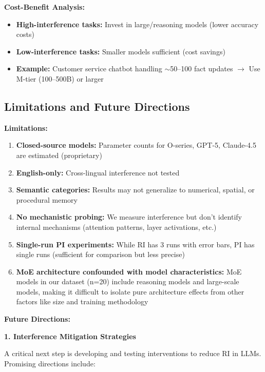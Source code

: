 \documentclass{article}
\begin{document}
\textbf{Cost-Benefit Analysis:}
\begin{itemize}[itemsep=2pt,topsep=3pt,parsep=0pt]
    \item \textbf{High-interference tasks:} Invest in large/reasoning models (lower accuracy costs)
    \item \textbf{Low-interference tasks:} Smaller models sufficient (cost savings)
    \item \textbf{Example:} Customer service chatbot handling $\sim$50--100 fact updates $\rightarrow$ Use M-tier (100--500B) or larger
\end{itemize}

\subsection{Limitations and Future Directions}

\textbf{Limitations:}

\begin{enumerate}
    \item \textbf{Closed-source models:} Parameter counts for O-series, GPT-5, Claude-4.5 are estimated (proprietary)
    \item \textbf{English-only:} Cross-lingual interference not tested
    \item \textbf{Semantic categories:} Results may not generalize to numerical, spatial, or procedural memory
    \item \textbf{No mechanistic probing:} We measure interference but don't identify internal mechanisms (attention patterns, layer activations, etc.)
    \item \textbf{Single-run PI experiments:} While RI has 3 runs with error bars, PI has single runs (sufficient for comparison but less precise)
    \item \textbf{MoE architecture confounded with model characteristics:} MoE models in our dataset (n=20) include reasoning models and large-scale models, making it difficult to isolate pure architecture effects from other factors like size and training methodology
\end{enumerate}

\textbf{Future Directions:}

\textbf{1. Interference Mitigation Strategies}

A critical next step is developing and testing interventions to reduce RI in LLMs. Promising directions include:
\end{document}

